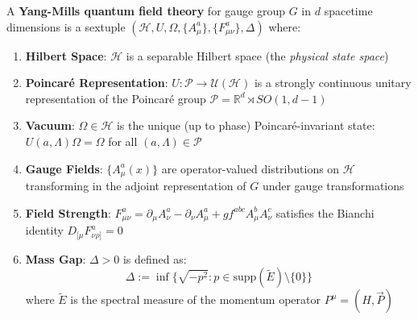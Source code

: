 \begin{definition}
\label{def:ym-qft-rigorous}
A \textbf{Yang-Mills quantum field theory} for gauge group $G$ in $d$ spacetime 
dimensions is a sextuple $(\mathcal{H}, U, \Omega, \{A_\mu^a\}, \{F_{\mu\nu}^a\}, \Delta)$ where:

\begin{enumerate}[label=\textbf{(YM\arabic*)}]
\item \textbf{Hilbert Space}: $\mathcal{H}$ is a separable Hilbert space 
(the \textit{physical state space})

\item \textbf{Poincaré Representation}: $U: \mathcal{P} \to \mathcal{U}(\mathcal{H})$ 
is a strongly continuous unitary representation of the Poincaré group 
$\mathcal{P} = \mathbb{R}^{d} \rtimes SO(1,d-1)$

\item \textbf{Vacuum}: $\Omega \in \mathcal{H}$ is the unique (up to phase) 
Poincaré-invariant state: $U(a, \Lambda)\Omega = \Omega$ for all $(a, \Lambda) \in \mathcal{P}$

\item \textbf{Gauge Fields}: $\{A_\mu^a(x)\}$ are operator-valued distributions 
on $\mathcal{H}$ transforming in the adjoint representation of $G$ under gauge 
transformations

\item \textbf{Field Strength}: $F_{\mu\nu}^a = \partial_\mu A_\nu^a - \partial_\nu A_\mu^a 
+ g f^{abc} A_\mu^b A_\nu^c$ satisfies the Bianchi identity 
$D_{[\mu} F_{\nu\rho]}^a = 0$

\item \textbf{Mass Gap}: $\Delta > 0$ is defined as:
\[
\Delta := \inf\{\sqrt{-p^2} : p \in \text{supp}(\tilde{E}) \setminus \{0\}\}
\]
where $\tilde{E}$ is the spectral measure of the momentum operator $P^\mu = (H, \vec{P})$
\end{enumerate}
\end{definition}

